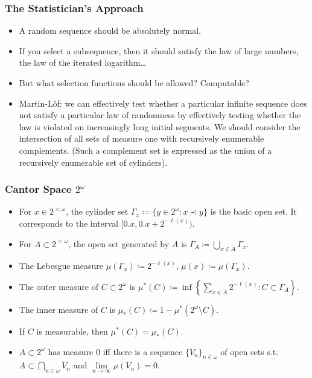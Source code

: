 \documentclass[UTF8,11pt,colorlinks,compress,openany]{beamer}%
\begin{document}
\begin{frame}\frametitle{The Statistician's Approach}
\begin{itemize}
	\item A random sequence should be absolutely normal.
	\item If you select a subsequence, then it should satisfy the law of large numbers, the law of the iterated logarithm\dots
	\item But what selection functions should be allowed? Computable?
	\item Martin-L\"of: we can effectively test whether a particular infinite sequence does not satisfy a particular law of randomness by effectively testing whether the law is violated on increasingly long initial segments. We should consider the intersection of all sets of measure one with recursively enumerable complements. (Such a complement set is expressed as the union of a recursively enumerable set of cylinders).
\end{itemize}
\end{frame}

\begin{frame}\frametitle{Cantor Space $2^\omega$}
\begin{itemize}
	\item For $x\in 2^{<\omega}$, the cylinder set $\Gamma_x\coloneqq \{y\in 2^\omega: x\prec y\}$ is the basic open set. It corresponds to the interval $[0.x,0.x+2^{-\ell(x)})$.
	\item For $A\subset 2^{<\omega}$, the open set generated by $A$ is $\Gamma_A\coloneqq \bigcup\limits_{x\in A}\Gamma_x$.
	\item The Lebesgue measure $\mu(\Gamma_x)\coloneqq 2^{-\ell(x)}$, $\mu(x)\coloneqq \mu(\Gamma_x)$.
	\item The outer measure of $C\subset 2^\omega$ is $\mu^*(C)\coloneqq \inf\left\{\sum\limits_{x\in A}2^{-\ell(x)}: C\subset\Gamma_A\right\}$.
	\item The inner measure of $C$ is $\mu_*(C)\coloneqq 1-\mu^*(2^\omega\setminus C)$.
	\item If $C$ is measurable, then $\mu^*(C)=\mu_*(C)$.
	\item $A\subset 2^\omega$ has measure $0$ iff there is a sequence $\{V_n\}_{n\in\omega}$ of open sets s.t. $A\subset\bigcap\limits_{n\in\omega}V_n$ and $\lim\limits_{n\to\infty}\mu(V_n)=0$.
\end{itemize}
\end{frame}
\end{document}
